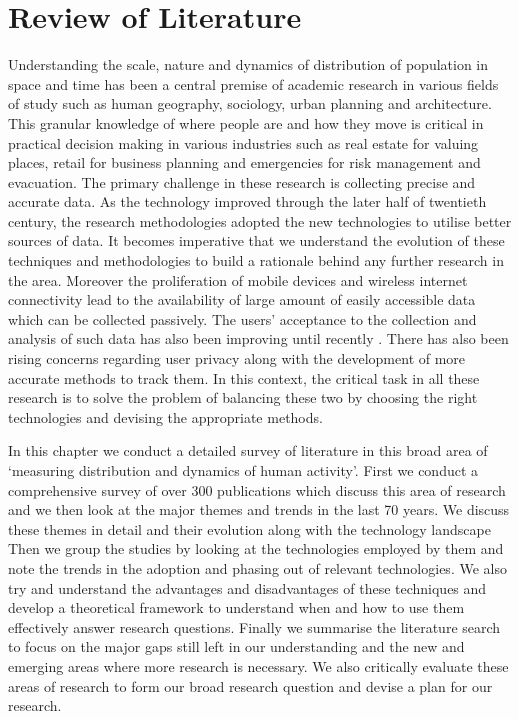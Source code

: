 \chapter{Review of Literature}

Understanding the scale, nature and dynamics of distribution of population in space and time has been a central premise of academic research in various fields of study such as human geography, sociology, urban planning and architecture.
This granular knowledge of where people are and how they move is critical in practical decision making in various industries such as real estate for valuing places, retail for business planning and emergencies for risk management and evacuation.
The primary challenge in these research is collecting precise and accurate data.
As the technology improved through the later half of twentieth century, the research methodologies adopted the new technologies to utilise better sources of data.
It becomes imperative that we understand the evolution of these techniques and methodologies to build a rationale behind any further research in the area.
Moreover the proliferation of mobile devices and wireless internet connectivity lead to the availability of large amount of easily accessible data which can be collected passively.
The users' acceptance to the collection and analysis of such data has also been improving until recently \cite{kobsa2014user}.
There has also been rising concerns regarding user privacy along with the development of more accurate methods to track them.
In this context, the critical task in all these research is to solve the problem of balancing these two by choosing the right technologies and devising the appropriate methods.

In this chapter we conduct a detailed survey of literature in this broad area of `measuring distribution and dynamics of human activity'.
First we conduct a comprehensive survey of over 300 publications which discuss this area of research and we then look at the major themes and trends in the last 70 years.
We discuss these themes in detail and their evolution along with the technology landscape
Then we group the studies by looking at the technologies employed by them and note the trends in the adoption and phasing out of relevant technologies.
We also try and understand the advantages and disadvantages of these techniques and develop a theoretical framework to understand when and how to use them effectively answer research questions.
Finally we summarise the literature search to focus on the major gaps still left in our understanding and the new and emerging areas where more research is necessary. We also critically evaluate these areas of research to form our broad research question and devise a plan for our research. 






